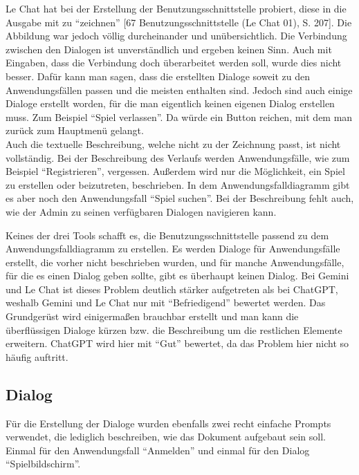 Le Chat hat bei der Erstellung der Benutzungsschnittstelle probiert, diese in die Ausgabe mit zu ``zeichnen'' [67 Benutzungsschnittstelle (Le Chat 01), S. 207]. Die Abbildung war jedoch 
völlig durcheinander und unübersichtlich. Die Verbindung zwischen den Dialogen ist unverständlich und ergeben keinen Sinn. Auch mit 
Eingaben, dass die Verbindung doch überarbeitet werden soll, wurde dies nicht besser. Dafür kann man sagen, dass die erstellten Dialoge 
soweit zu den Anwendungsfällen passen und die meisten enthalten sind. Jedoch sind auch einige Dialoge erstellt worden, für die man 
eigentlich keinen eigenen Dialog erstellen muss. Zum Beispiel ``Spiel verlassen''. Da würde ein Button reichen, mit dem man zurück zum 
Hauptmenü gelangt.\\
Auch die textuelle Beschreibung, welche nicht zu der Zeichnung passt, ist nicht vollständig. Bei der Beschreibung des Verlaufs werden 
Anwendungsfälle, wie zum Beispiel ``Registrieren'', vergessen. Außerdem wird nur die Möglichkeit, ein Spiel zu erstellen oder beizutreten, 
beschrieben. In dem Anwendungsfalldiagramm gibt es aber noch den Anwendungsfall ``Spiel suchen''. Bei der Beschreibung fehlt auch, wie der 
Admin zu seinen verfügbaren Dialogen navigieren kann.

Keines der drei Tools schafft es, die Benutzungsschnittstelle passend zu dem Anwendungsfalldiagramm zu erstellen. Es werden Dialoge für 
Anwendungsfälle erstellt, die vorher nicht beschrieben wurden, und für manche Anwendungsfälle, für die es einen Dialog geben sollte, gibt 
es überhaupt keinen Dialog. Bei Gemini und Le Chat ist dieses Problem deutlich stärker aufgetreten als bei ChatGPT, weshalb Gemini und 
Le Chat nur mit ``Befriedigend'' bewertet werden. Das Grundgerüst wird einigermaßen brauchbar erstellt und man kann die überflüssigen Dialoge 
kürzen bzw. die Beschreibung um die restlichen Elemente erweitern. ChatGPT wird hier mit ``Gut'' bewertet, da das Problem hier nicht so 
häufig auftritt.

\clearpage

\subsection*{Dialog}

Für die Erstellung der Dialoge wurden ebenfalls zwei recht einfache Prompts verwendet, die lediglich beschreiben, wie das Dokument aufgebaut 
sein soll. Einmal für den Anwendungsfall ``Anmelden'' und einmal für den Dialog ``Spielbildschirm''.


